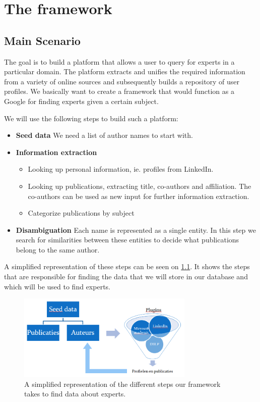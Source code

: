 \chapter{The framework}

\section{Main Scenario}

The goal is to build a platform that allows a user to query for experts in a particular domain. The
platform extracts and unifies the required information from a variety of online sources and
subsequently builds a repository of user profiles. We basically want to create a framework that would function as a Google for finding experts given a certain subject.

We will use the following steps to build such a platform:


\begin{itemize}
	\item \textbf{Seed data} We need a list of author names to start with.
	\item \textbf{Information extraction}
		\begin{itemize}
			\item Looking up personal information, ie. profiles from LinkedIn.
			\item Looking up publications, extracting title, co-authors and affiliation. The co-authors can be used as new input for further information extraction.
			\item Categorize publications by subject
		\end{itemize}
	\item \textbf{Disambiguation} Each name is represented as a single entity. In this step we search for similarities between these entities to decide what publications belong to the same author.
\end{itemize}

A simplified representation of these steps can be seen on \ref{fig:db-gegevens}. It shows the steps that are responsible for finding the data that we will store in our database and which will be used to find experts.

\begin{figure}[htbp]
	\centering
		\includegraphics[width=0.75\textwidth]{fig/database-gegevens.png}
	\caption{A simplified representation of the different steps our framework takes to find data about experts.}
	\label{fig:db-gegevens}
\end{figure}

